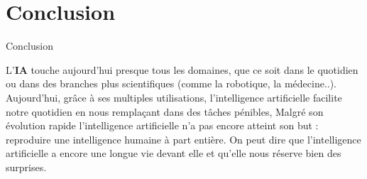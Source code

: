 \section{Conclusion}

\begin{frame}{Conclusion}
    \begin{enumerate}[<+-|alert@+>]
        \myitem
            L'\textbf{IA} touche aujourd'hui presque tous les domaines, que ce soit dans le
            quotidien ou dans des branches plus
            scientifiques (comme la robotique, la médecine..).
        \myitem
            Aujourd'hui, grâce à ses multiples utilisations, l'intelligence artificielle
            facilite notre quotidien en nous remplaçant dans des tâches pénibles,
        \myitem
            Malgré son évolution rapide l'intelligence artificielle n'a pas
            encore atteint son but : reproduire une intelligence humaine à part
            entière. On peut dire que l'intelligence artificielle a encore une
            longue vie devant elle et qu'elle nous réserve bien des surprises.\mybox

    \end{enumerate}
\end{frame}


